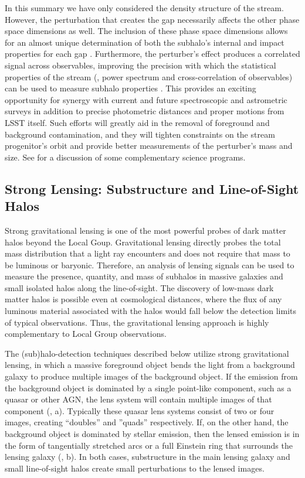 In this summary we have only considered the density structure of the stream. However, the perturbation that creates the gap necessarily affects the other phase space dimensions as well. The inclusion of these phase space dimensions allows for an almost unique determination of both the subhalo's internal and impact properties for each gap \citep{erkal2015b}. Furthermore, the perturber's effect produces a correlated signal across observables, improving the precision with which the statistical properties of the stream (\eg, power spectrum and cross-correlation of observables) can be used to measure subhalo properties \citep{bovy:2017}. This provides an exciting opportunity for synergy with current and future spectroscopic and astrometric surveys in addition to precise photometric distances and proper motions from LSST itself. Such efforts will greatly aid in the removal of foreground and background contamination, and they will tighten constraints on the stream progenitor's orbit and provide better measurements of the perturber's mass and size. See  for a discussion of some complementary science programs.



\subsection{Strong Lensing: Substructure and Line-of-Sight Halos }
\label{sec:stronglens} 

Strong gravitational lensing is one of the most powerful probes of dark matter halos beyond the Local Goup. 
Gravitational lensing directly probes the total mass distribution that a light ray encounters and does not require that mass to be luminous or baryonic.
Therefore, an analysis of lensing signals can be used to measure the presence, quantity, and mass of subhalos in massive galaxies and small isolated halos along the line-of-sight.  
The discovery of low-mass dark matter halos is possible even at cosmological distances, where the flux of any luminous material associated with the halos would fall below the detection limits of typical observations.  
Thus, the gravitational lensing approach is highly complementary to Local Group observations.

The (sub)halo-detection techniques described below utilize strong gravitational lensing, in which a massive foreground object bends the light from a background galaxy to produce multiple images of the background object.  
If the emission from the background object is dominated by a single point-like component, such as a quasar or other AGN, the lens system will contain multiple images of that component (\eg, a).
Typically these quasar lens systems consist of two or four images, creating ``doubles'' and ''quads'' respectively. 
If, on the other hand, the background object is dominated by stellar emission, then the lensed emission is in the form of tangentially stretched arcs or a full Einstein ring that surrounds the lensing galaxy (\eg, b).  
In both cases, substructure in the main lensing galaxy and small line-of-sight halos create small perturbations to the lensed images.

